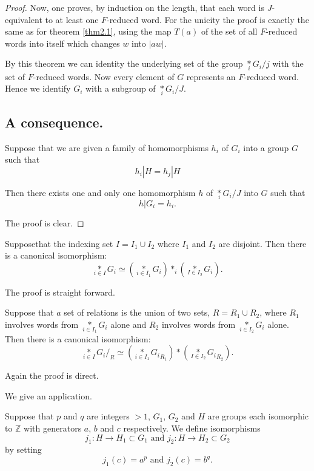 \begin{proof}
Now, one proves, by induction on the length, that each word is
$J$-equivalent to at least one $F$-reduced word. For the unicity the
proof is exactly the same as for theorem \ref{thm2.1}, using the map $T(a)$ of
the set of all $F$-reduced words into itself which changes $w$ into
$| aw |$.  
 
By this theorem we can identity the underlying set of the group
$\underset{i}{\ast}    
G_i /j$ with the set of $F$-reduced words. Now every element of $G$
represents an $F$-reduced word. Hence we identify $G_i$ with a
subgroup of $\underset{i}{\ast} G_i / J$. 

\setcounter{subsection}{7}
\subsection{\bf A consequence.}\label{sec2.8}
 Suppose that we are given  a family of homomorphisms $h_i$ of  $G_i$
 into a group $G$ such that  
$$
h_i | H= h_j | H 
$$

Then there exists one and only one homomorphism $h$ of
$\underset{i}{\ast} G_i / J$
into $G$ such that  
$$
h | G_i = h_i.
$$

The proof is clear.
\end{proof}

\begin{remarks*}
Suppose\pageoriginale that the indexing set $I = I_1\cup I_2$ where
$I_1$ and $I_2$ are disjoint. Then there is a canonical isomorphism:   
$$ 
\underset{i \in I}{\ast}  G_i \simeq \left(\underset{i \in I_1}{\ast}
G_i \right) \ast_i \left(\underset{I \in I_2}{\ast} G_i\right).   
$$

The proof is straight forward.
\end{remarks*}

Suppose that $a$ set of relations is the union of two sets, $R = R_1
\cup R_2$, where $R_1$ involves words from $\underset{i \in
  I_1}{\ast} G_i$ alone and $R_2$ involves words from
$\underset{i \in I_2}{\ast}G_i$ alone. Then there is a canonical 
isomorphism:    
$$
\underset{i \in I}{\ast} G_i \bigg/_R \simeq \left(\underset{i \in
  I_1}{\ast} {G_i}_{R_1} \right) \ast \left(\underset{I \in
  I_2}{\ast} {G_i}_{R_2} \right).  
$$

Again the proof is direct.

We give an application.

Suppose that $p$ and $q$ are integers $> 1$, $G_1$, $G_2$ and $H$ are
groups each isomorphic to $\mathbb{Z}$ with generators $a$, $b$ and $c$
respectively. We define isomorphisms 
$$
j_1 :H \to H_1 \subset G_1 \text{ and } j_2 : H \to H_2 \subset G_2
$$
by setting  
$$
j_1 (c)  = a^p \text{ and } j_2 (c)  = b^q. 
$$

